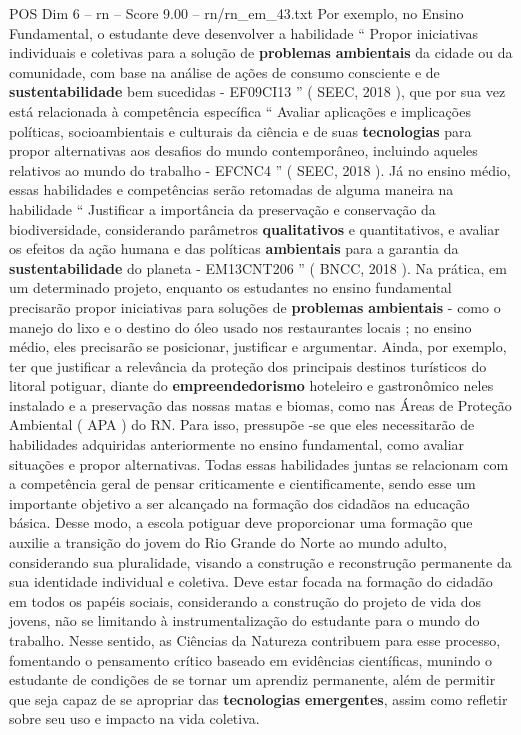 \begin{textsample}{POS Dim 6 – rn – Score 9.00 – rn/rn\_em\_43.txt}
Por exemplo, no Ensino Fundamental, o estudante deve desenvolver a habilidade “ Propor iniciativas individuais e coletivas para a solução de \textbf{problemas} \textbf{ambientais} da cidade ou da comunidade, com base na análise de ações de consumo consciente e de \textbf{sustentabilidade} bem sucedidas - EF09CI13 ” ( SEEC, 2018 ), que por sua vez está relacionada à competência específica “ Avaliar aplicações e implicações políticas, socioambientais e culturais da ciência e de suas \textbf{tecnologias} para propor alternativas aos desafios do mundo contemporâneo, incluindo aqueles relativos ao mundo do trabalho - EFCNC4 ” ( SEEC, 2018 ).
Já no ensino médio, essas habilidades e competências serão retomadas de alguma maneira na habilidade “ Justificar a importância da preservação e conservação da biodiversidade, considerando parâmetros \textbf{qualitativos} e quantitativos, e avaliar os efeitos da ação humana e das políticas \textbf{ambientais} para a garantia da \textbf{sustentabilidade} do planeta - EM13CNT206 ” ( BNCC, 2018 ).
Na prática, em um determinado projeto, enquanto os estudantes no ensino fundamental precisarão propor iniciativas para soluções de \textbf{problemas} \textbf{ambientais} - como o manejo do lixo e o destino do óleo usado nos restaurantes locais ; no ensino médio, eles precisarão se posicionar, justificar e argumentar.
Ainda, por exemplo, ter que justificar a relevância da proteção dos principais destinos turísticos do litoral potiguar, diante do \textbf{empreendedorismo} hoteleiro e gastronômico neles instalado e a preservação das nossas matas e biomas, como nas Áreas de Proteção Ambiental ( APA ) do RN.
Para isso, pressupõe -se que eles necessitarão de habilidades adquiridas anteriormente no ensino fundamental, como avaliar situações e propor alternativas.
Todas essas habilidades juntas se relacionam com a competência geral de pensar criticamente e cientificamente, sendo esse um importante objetivo a ser alcançado na formação dos cidadãos na educação básica.
Desse modo, a escola potiguar deve proporcionar uma formação que auxilie a transição do jovem do Rio Grande do Norte ao mundo adulto, considerando sua pluralidade, visando a construção e reconstrução permanente da sua identidade individual e coletiva.
Deve estar focada na formação do cidadão em todos os papéis sociais, considerando a construção do projeto de vida dos jovens, não se limitando à instrumentalização do estudante para o mundo do trabalho.
Nesse sentido, as Ciências da Natureza contribuem para esse processo, fomentando o pensamento crítico baseado em evidências científicas, munindo o estudante de condições de se tornar um aprendiz permanente, além de permitir que seja capaz de se apropriar das \textbf{tecnologias} \textbf{emergentes}, assim como refletir sobre seu uso e impacto na vida coletiva.

\end{textsample}
